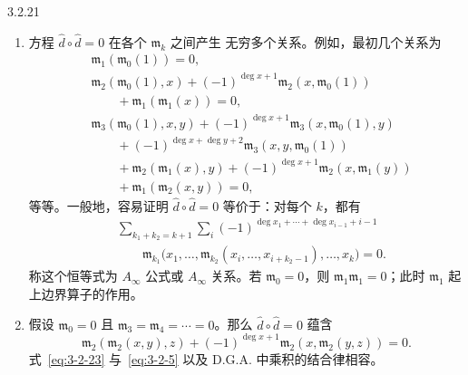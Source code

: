\begin{remark}{3.2.21}\label{rem:3-2-21}
\begin{enumerate}[label=\textup{(\arabic*)},leftmargin=2.8em]
  \item 方程 $\widehat d\circ\widehat d=0$ 在各个 $\mathfrak m_k$ 之间产生
  无穷多个关系。例如，最初几个关系为
  \[
  \begin{aligned}
    &\mathfrak m_1(\mathfrak m_0(1))=0,\\
    &\mathfrak m_2(\mathfrak m_0(1),x)
      +(-1)^{\deg x+1}\mathfrak m_2(x,\mathfrak m_0(1))\\
    &\qquad{}+\mathfrak m_1(\mathfrak m_1(x))=0,\\
    &\mathfrak m_3(\mathfrak m_0(1),x,y)
      +(-1)^{\deg x+1}\mathfrak m_3(x,\mathfrak m_0(1),y)\\
    &\qquad{}+(-1)^{\deg x+\deg y+2}
      \mathfrak m_3(x,y,\mathfrak m_0(1))\\
    &\qquad{}+\mathfrak m_2(\mathfrak m_1(x),y)
      +(-1)^{\deg x+1}\mathfrak m_2(x,\mathfrak m_1(y))\\
    &\qquad{}+\mathfrak m_1(\mathfrak m_2(x,y))=0,
  \end{aligned}
  \]
  等等。一般地，容易证明 $\widehat d\circ\widehat d=0$ 等价于：对每个
  $k$，都有
  \begin{equation}
  \begin{aligned}
    &\sum_{k_1+k_2=k+1}\sum_i
    (-1)^{\deg x_1+\cdots+\deg x_{i-1}+i-1}\\
    &\qquad\mathfrak m_{k_1}
    \bigl(x_1,\ldots,
      \mathfrak m_{k_2}(x_i,\ldots,x_{i+k_2-1}),
      \ldots,x_k\bigr)=0.
  \end{aligned}
  \tag{3.2.22}\label{eq:3-2-22}
  \end{equation}
  称这个恒等式为 $A_\infty$ 公式或 $A_\infty$ 关系。若
  $\mathfrak m_0=0$，则 $\mathfrak m_1\mathfrak m_1=0$；此时
  $\mathfrak m_1$ 起上边界算子的作用。

  \item 假设 $\mathfrak m_0=0$ 且
  $\mathfrak m_3=\mathfrak m_4=\cdots=0$。那么
  $\widehat d\circ\widehat d=0$ 蕴含
  \begin{equation}
    \mathfrak m_2(\mathfrak m_2(x,y),z)
    +(-1)^{\deg x+1}\mathfrak m_2(x,\mathfrak m_2(y,z))=0.
    \tag{3.2.23}\label{eq:3-2-23}
  \end{equation}
  式~\eqref{eq:3-2-23} 与~\eqref{eq:3-2-5} 以及 D.G.A. 中乘积的结合律相容。


\end{enumerate}
\end{remark}
